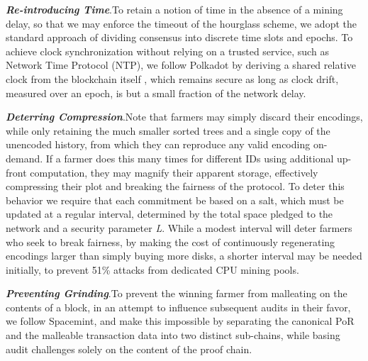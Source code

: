 \documentclass[conference]{IEEEtran}
\begin{document}
\vspace{2mm}

\noindent \textbf{\textit{Re-introducing Time}}.\quad To retain a notion of time in the absence of a mining delay, so that we may enforce the timeout of the hourglass scheme, we adopt the standard approach of dividing consensus into discrete time slots and epochs. To achieve clock synchronization without relying on a trusted service, such as Network Time Protocol (NTP), we follow Polkadot by deriving a shared relative clock from the blockchain itself \cite{alper2019network}, which remains secure as long as clock drift, measured over an epoch, is but a small fraction of the network delay.

\vspace{2mm}

\noindent \textbf{\textit{Deterring Compression}}.\quad Note that farmers may simply discard their encodings, while only retaining the much smaller sorted trees and a single copy of the unencoded history, from which they can reproduce any valid encoding on-demand. If a farmer does this many times for different IDs using additional up-front  computation, they may magnify their apparent storage, effectively compressing their plot and breaking the fairness of the protocol. To deter this behavior we require that each commitment be based on a salt, which must be updated at a regular interval, determined by the total space pledged to the network and a security parameter \textit{L}. While a modest interval will deter farmers who seek to break fairness, by making the cost of continuously regenerating encodings larger than simply buying more disks, a shorter interval may be needed initially, to prevent 51\% attacks from dedicated CPU mining pools.

\vspace{2mm}

\noindent \textbf{\textit{Preventing Grinding}}.\quad To prevent the winning farmer from malleating on the contents of a block, in an attempt to influence subsequent audits in their favor, we follow Spacemint, and make this impossible by separating the canonical PoR and the malleable transaction data into two distinct sub-chains, while basing audit challenges solely on the content of the proof chain.

\vspace{2mm}
\end{document}

